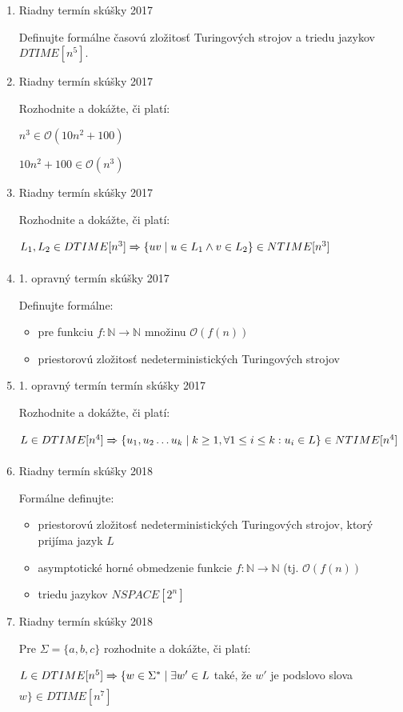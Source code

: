 \documentclass[]{article}
\begin{document}
	\begin{enumerate}
		\item Riadny termín skúšky 2017
		
		Definujte formálne časovú zložitosť Turingových strojov a triedu jazykov $DTIME[n^5]$.
		
		\item Riadny termín skúšky 2017
		
		Rozhodnite a dokážte, či platí:
		
		$n^3 \in \mathcal{O}(10n^2 + 100)$
		
		$10n^2 + 100 \in \mathcal{O}(n^3)$
		
		\item Riadny termín skúšky 2017
		
		Rozhodnite a dokážte, či platí:
		
		$L_1, L_2 \in DTIME[n^3] \xRightarrow[]{} \{ uv \mid u \in  L_1 \land v \in L_2\} \in NTIME[n^3]$
		
		\item 1. opravný termín skúšky 2017
		
		Definujte formálne:
		
		\begin{itemize}
			\item pre funkciu $f: \mathbb{N} \rightarrow \mathbb{N}$ množinu $\mathcal{O}(f(n))$
			\item priestorovú zložitosť nedeterministických Turingových strojov
		\end{itemize}
	
		\item 1. opravný termín termín skúšky 2017
		
		Rozhodnite a dokážte, či platí:
		
		$L \in DTIME[n^4] \xRightarrow[]{} \{ u_1, u_2 \ldots u_k \mid k \geq 1, \forall 1 \leq i \leq k: u_i \in L\} \in NTIME[n^4]$
		
		\item Riadny termín skúšky 2018
		
		Formálne definujte:
		
		\begin{itemize}
			\item priestorovú zložitosť nedeterministických Turingových strojov, ktorý prijíma jazyk $L$
			\item asymptotické horné obmedzenie funkcie $f: \mathbb{N} \rightarrow \mathbb{N}$ (tj. $\mathcal{O}(f(n))$
			\item triedu jazykov $NSPACE[2^n]$
		\end{itemize}
	
		\item Riadny termín skúšky 2018
		
		Pre $\Sigma = \{a,b,c\}$ rozhodnite a dokážte, či platí:
		
		$L \in DTIME[n^5] \xRightarrow[]{} \{ w \in \Sigma^* \mid \exists w' \in L$ také, že $w'$ je podslovo slova $w\} \in DTIME[n^7]$
	\end{enumerate}
\end{document}
